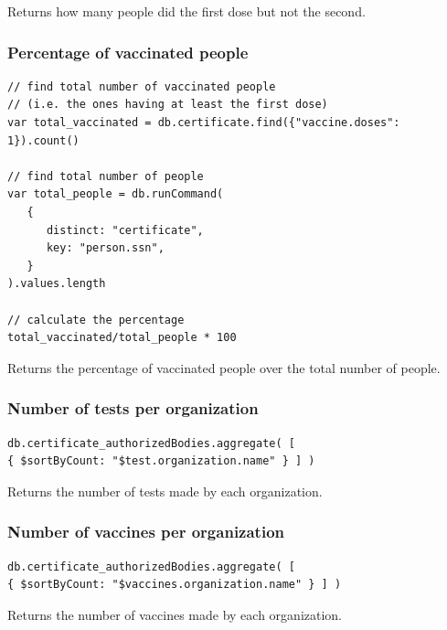 \documentclass[12pt, a4paper]{article}
\begin{document}
\noindent 
Returns how many people did the first dose but not the second.

\subsubsection{Percentage of vaccinated people}
\begin{tcolorbox}[fontupper=\scriptsize]
    \begin{verbatim}
// find total number of vaccinated people 
// (i.e. the ones having at least the first dose)
var total_vaccinated = db.certificate.find({"vaccine.doses": 1}).count()

// find total number of people
var total_people = db.runCommand(
   {
      distinct: "certificate",
      key: "person.ssn",
   }
).values.length

// calculate the percentage
total_vaccinated/total_people * 100
    \end{verbatim}
\end{tcolorbox}

\noindent
Returns the percentage of vaccinated people over the total number of people.

\subsubsection{Number of tests per organization}
\begin{tcolorbox}[fontupper=\scriptsize]
    \begin{verbatim}
db.certificate_authorizedBodies.aggregate( [  
{ $sortByCount: "$test.organization.name" } ] )
    \end{verbatim}
\end{tcolorbox}

\noindent
Returns the number of tests made by each organization.

\subsubsection{Number of vaccines per organization}
\begin{tcolorbox}[fontupper=\scriptsize]
    \begin{verbatim}
db.certificate_authorizedBodies.aggregate( [  
{ $sortByCount: "$vaccines.organization.name" } ] )
    \end{verbatim}
\end{tcolorbox}

\noindent
Returns the number of vaccines made by each organization.
\end{document}
